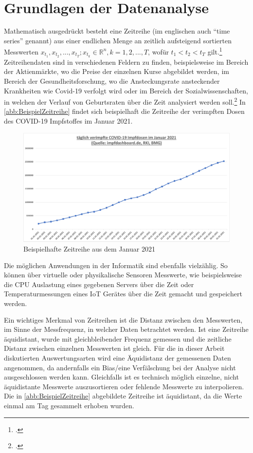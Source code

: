 \section{Grundlagen der Datenanalyse}\label{chap:GrundlagenDatenanalyse}

Mathematisch ausgedrückt besteht eine Zeitreihe (im englischen auch \enquote{time series} genannt) aus einer endlichen Menge an zeitlich aufsteigend sortierten Messwerten $x_{t_1},x_{t_2},...,x_{t_T};  x_{t_k} \in \mathbb{R}^n, k=1,2,...,T$, wofür $t_1 < t_2 < t_T $ gilt.\footcite[Vgl.][1]{Deistler.2018b} 
Zeitreihendaten sind in verschiedenen Feldern zu finden, beispielsweise im Bereich der Aktienmärkte, wo die Preise der einzelnen Kurse abgebildet werden, im Bereich der Gesundheitsforschung, wo die Ansteckungsrate ansteckender Krankheiten wie Covid-19 verfolgt wird oder im Bereich der Sozialwissenschaften, in welchen der Verlauf von Geburtsraten über die Zeit analysiert werden soll.\footcite[Vgl.][1]{Shumway.2017b} 
In \autoref{abb:BeispielZeitreihe} findet sich beispielhaft die Zeitreihe der verimpften Dosen des COVID-19 Impfstoffes im Januar 2021.

\begin{figure}[H]
\centering
\includegraphics[width=\textwidth]{graphics/Beispiel-Zeitreihe.pdf}
\caption{Beispielhafte Zeitreihe aus dem Januar 2021}
\label{abb:BeispielZeitreihe}
\end{figure}

Die möglichen Anwendungen in der Informatik sind ebenfalls vielzählig. So können über virtuelle oder physikalische Sensoren Messwerte, wie beispielsweise die CPU Auslastung eines gegebenen Servers über die Zeit oder Temperaturmessungen eines \ac{IoT} Gerätes über die Zeit gemacht und gespeichert werden.

Ein wichtiges Merkmal von Zeitreihen ist die Distanz zwischen den Messwerten, im Sinne der Messfrequenz, in welcher Daten betrachtet werden.  Ist eine Zeitreihe äquidistant, wurde mit gleichbleibender Frequenz gemessen und die zeitliche Distanz zwischen einzelnen Messwerten ist gleich. Für die in dieser Arbeit diskutierten Auswertungsarten wird eine Äquidistanz der gemessenen Daten angenommen, da andernfalls ein Bias/eine Verfälschung bei der Analyse nicht ausgeschlossen werden kann. Gleichfalls ist es technisch möglich einzelne, nicht äquidistante Messwerte auszusortieren oder fehlende Messwerte zu interpolieren. Die in \autoref{abb:BeispielZeitreihe} abgebildete Zeitreihe ist äquidistant, da die Werte einmal am Tag gesammelt erhoben wurden.

